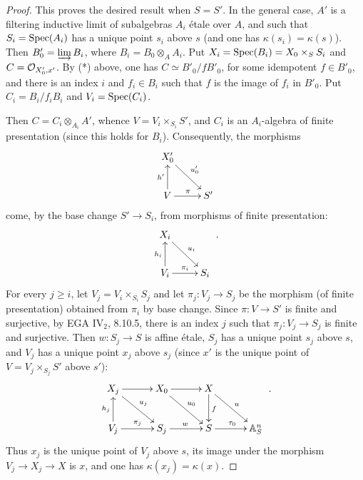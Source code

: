 \begin{proof}
This proves the desired result when $S=S'$. In the general case, $A'$ is a filtering inductive limit of subalgebras $A_i$ étale over $A$, and such that $S_i=\operatorname{Spec}(A_i)$ has a unique point $s_i$ above $s$ (and one has $\kappa(s_i)=\kappa(s)$). Then $B'_0=\varinjlim B_i$, where $B_i=B_0\otimes_AA_i$. Put $X_i=\operatorname{Spec}(B_i)=X_0\times_SS_i$ and $C=\mathcal{O}_{X'_0,x'}$. By (*) above, one has $C\simeq B'_0/fB'_0$, for some idempotent $f\in B'_0$, and there is an index $i$ and $f_i\in B_i$ such that $f$ is the image of $f_i$ in $B'_0$. Put $C_i=B_i/f_iB_i$ and $V_i=\operatorname{Spec}(C_i)$.

Then $C=C_i\otimes_{A_i}A'$, whence $V=V_i\times_{S_i}S'$, and $C_i$ is an $A_i$-algebra of finite presentation (since this holds for $B_i$). Consequently, the morphisms
\[
\xymatrix{X'_0\ar[dr]^{u'_0}&\\V\ar[u]^{h'}\ar[r]^\pi&S'}
\]
come, by the base change $S'\to S_i$, from morphisms of finite presentation:
\[
\xymatrix{X_i\ar[dr]^{u_i}&\\V_i\ar[u]^{h_i}\ar[r]^{\pi_i}&S_i}\ .
\]
For every $j\ge i$, let $V_j=V_i\times_{S_i}S_j$ and let $\pi_j:V_j\to S_j$ be the morphism (of finite presentation) obtained from $\pi_i$ by base change. Since $\pi:V\to S'$ is finite and surjective, by EGA IV$_2$, 8.10.5, there is an index $j$ such that $\pi_j:V_j\to S_j$ is finite and surjective. Then $w:S_j\to S$ is affine étale, $S_j$ has a unique point $s_j$ above $s$, and $V_j$ has a unique point $x_j$ above $s_j$ (since $x'$ is the unique point of $V=V_j\times_{S_j}S'$ above $s'$):
\[
\xymatrix@C=3em{X_j\ar[r]\ar[dr]^{u_j}&X_0\ar[r]\ar[dr]^{u_0}&X\ar[d]^f\ar[dr]^u&\\V_j\ar[u]^{h_j}\ar[r]^{\pi_j}&S_j\ar[r]^w&S\ar[r]^{\tau_0}&\mathbb A_S^n}\ .
\]
Thus $x_j$ is the unique point of $V_j$ above $s$, its image under the morphism $V_j\to X_j\to X$ is $x$, and one has $\kappa(x_j)=\kappa(x)$.
\end{proof}
